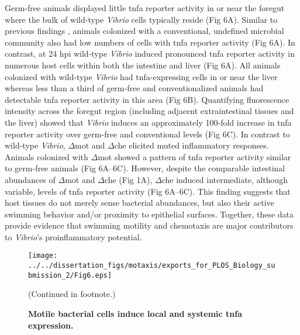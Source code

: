 {{{{{Germ-free animals displayed little tnfa reporter activity in or near the foregut where the bulk of wild-type \textit{Vibrio} cells typically reside (Fig 6A). Similar to previous findings \cite{marjoram_epigenetic_2015}, animals colonized with a conventional, undefined microbial community also had low numbers of cells with tnfa reporter activity (Fig 6A). In contrast, at 24 hpi wild-type \textit{Vibrio} induced pronounced tnfa reporter activity in numerous host cells within both the intestine and liver (Fig 6A). All animals colonized with wild-type \textit{Vibrio} had tnfa-expressing cells in or near the liver whereas less than a third of germ-free and conventionalized animals had detectable tnfa reporter activity in this area (Fig 6B). Quantifying fluorescence intensity across the foregut region (including adjacent extraintestinal tissues and the liver) showed that \textit{Vibrio} induces an approximately 100-fold increase in tnfa reporter activity over germ-free and conventional levels (Fig 6C). In contrast to wild-type \textit{Vibrio}, $\Delta$mot and $\Delta$che elicited muted inflammatory responses. Animals colonized with $\Delta$mot showed a pattern of tnfa reporter activity similar to germ-free animals (Fig 6A–6C). However, despite the comparable intestinal abundances of $\Delta$mot and $\Delta$che (Fig 1A), $\Delta$che induced intermediate, although variable, levels of tnfa reporter activity (Fig 6A–6C). This finding suggests that host tissues do not merely sense bacterial abundances, but also their active swimming behavior and/or proximity to epithelial surfaces. Together, these data provide evidence that swimming motility and chemotaxis are major contributors to \textit{Vibrio}'s proinflammatory potential. 

\begin{figure}%
	\centerline{
		\texttt{[image: ../../dissertation\_figs/motaxis/exports\_for\_PLOS\_Biology\_submission\_2/Fig6.eps]}}
	\caption{\textbf{Motile bacterial cells induce local and systemic tnfa expression.}}{(Continued in footnote.)}
	\label{fig:motaxis_fig6}
\end{figure}

}}}}}
